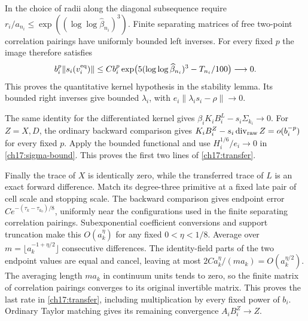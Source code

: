 In the choice of radii along the diagonal subsequence require
$r_i/a_{n_i}\le\exp((\log\log\widehat\beta_{n_i})^3)$.
Finite separating matrices of free two-point correlation pairings have uniformly bounded left
inverses. For every fixed $p$ the image therefore satisfies
\[
 b_i^p\|s_i(v_i^{\rm eq})\|
 \le C b_i^p\exp\bigl(5(\log\log\widehat\beta_{n_i})^3-T_{n_i}/100\bigr)
 \longrightarrow0.
\]
This proves the quantitative kernel hypothesis in the stability lemma.
Its bounded right inverses give bounded $\lambda_i$, with
$e_i\|\lambda_i s_i-\rho\|\to0$.

The same identity for the differentiated kernel gives
$\beta_iK_iB_i^L-s_i\Sigma_{k_i}\to0$.
For $Z=X,D$, the ordinary backward comparison gives
$K_iB_i^Z-s_i\operatorname{div}_{\rm raw}Z=o(b_i^{-p})$ for every
fixed $p$. Apply the bounded functional and use
$H_i^{1/6}/e_i\to0$ in \eqref{ch17:sigma-bound}.
This proves the first two lines of \eqref{ch17:transfer}.

Finally the trace of $X$ is identically zero, while the transferred
trace of $L$ is an exact forward difference. Match its degree-three
primitive at a fixed late pair of cell scale and stopping scale. The backward comparison gives endpoint
error $C e^{-(\tau_k-\tau_{k_0})/8}$, uniformly near the configurations used in the finite separating
correlation pairings. Subexponential coefficient conversions and support truncation
make this $O(a_k^\eta)$ for any fixed $0<\eta<1/8$.
Average over $m=\lfloor a_k^{-1+\eta/2}\rfloor$ consecutive differences.
The identity-field parts of the two endpoint values are equal and cancel, leaving at most
$2Ca_k^\eta/(ma_k)=O(a_k^{\eta/2})$.
The averaging length $ma_k$ in continuum units tends to zero, so the finite matrix of
correlation pairings converges to its original invertible matrix. This proves the
last rate in \eqref{ch17:transfer}, including multiplication by every
fixed power of $b_i$. Ordinary Taylor matching gives its remaining
convergence $A_iB_i^Z\to Z$.
